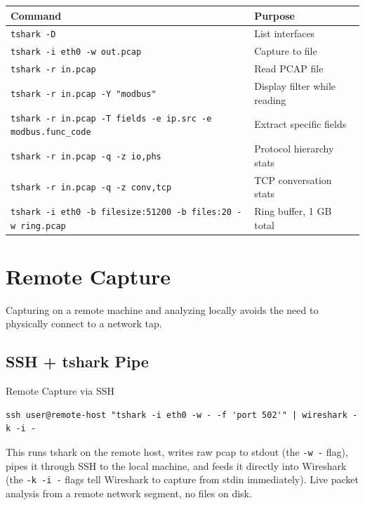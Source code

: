 \documentclass[12pt,twoside,openright]{memoir}
\begin{document}
\begin{quickref}
\begin{center}
\begin{tabular}{L{5cm}L{7cm}}
\toprule
\textbf{Command} & \textbf{Purpose} \\
\midrule
\texttt{tshark -D} & List interfaces \\
\texttt{tshark -i eth0 -w out.pcap} & Capture to file \\
\texttt{tshark -r in.pcap} & Read PCAP file \\
\texttt{tshark -r in.pcap -Y "modbus"} & Display filter while reading \\
\texttt{tshark -r in.pcap -T fields -e ip.src -e modbus.func\_code} & Extract specific fields \\
\texttt{tshark -r in.pcap -q -z io,phs} & Protocol hierarchy stats \\
\texttt{tshark -r in.pcap -q -z conv,tcp} & TCP conversation stats \\
\texttt{tshark -i eth0 -b filesize:51200 -b files:20 -w ring.pcap} & Ring buffer, 1 GB total \\
\bottomrule
\end{tabular}
\end{center}
\end{quickref}

\section{Remote Capture}

Capturing on a remote machine and analyzing locally avoids the need to physically connect to a network tap.

\subsection{SSH + tshark Pipe}
\begin{example}{Remote Capture via SSH}
\begin{lstlisting}
ssh user@remote-host "tshark -i eth0 -w - -f 'port 502'" | wireshark -k -i -
\end{lstlisting}
This runs tshark on the remote host, writes raw pcap to stdout (the \texttt{-w -} flag), pipes it through SSH to the local machine, and feeds it directly into Wireshark (the \texttt{-k -i -} flags tell Wireshark to capture from stdin immediately). Live packet analysis from a remote network segment, no files on disk.
\end{example}
\end{document}
